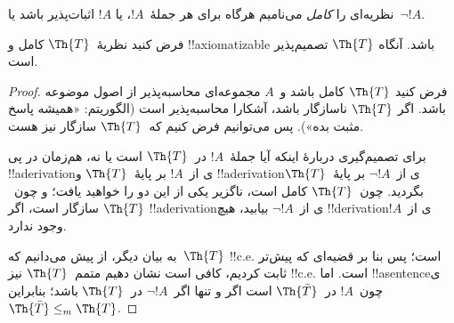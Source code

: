 \documentclass[../../../include/open-logic-section]{subfiles}
\begin{document}


نظریه‌ای را {\em کامل} می‌نامیم هرگاه برای هر جملهٔ~$!A$، یا
$!A$ اثبات‌پذیر باشد یا~$\lnot !A$.

\begin{lem}
فرض کنید نظریهٔ~$\Th{T}$ کامل و !!{axiomatizable} باشد. آنگاه
$\Th{T}$ تصمیم‌پذیر است.
\end{lem}

\begin{proof}
فرض کنید $\Th{T}$ کامل باشد و~$A$ مجموعه‌ای محاسبه‌پذیر از اصول موضوعه
باشد. اگر $\Th{T}$ ناسازگار باشد، آشکارا محاسبه‌پذیر است (الگوریتم:
«همیشه پاسخ مثبت بده»). پس می‌توانیم فرض کنیم که~$\Th{T}$ سازگار نیز
هست.

برای تصمیم‌گیری دربارهٔ اینکه آیا جملهٔ~$!A$ در~$\Th{T}$ است یا نه،
هم‌زمان در پی !!a{derivation}ی از~$!A$ بر پایهٔ~$\Th{T}$ و
!!a{derivation}ی از~$\lnot !A$ بر پایهٔ~$\Th{T}$ بگردید. چون~$\Th{T}$ کامل است، ناگزیر
یکی از این دو را خواهید یافت؛ و چون~$\Th{T}$ سازگار است، اگر
!!a{derivation}ی از~$\lnot !A$ بیابید، هیچ !!{derivation}ی از~$!A$
وجود ندارد.

به بیان دیگر، از پیش می‌دانیم که~$\Th{T}$ !!{c.e.} است؛ پس بنا بر
قضیه‌ای که پیش‌تر ثابت کردیم، کافی است نشان دهیم متمم~$\Th{T}$ نیز
!!{c.e.} است. اما !!a{sentence}ی چون~$!A$ در~$\Th{\bar T}$ است اگر و
تنها اگر~$\lnot !A$ در~$\Th{T}$ باشد؛ بنابراین
$\Th{\bar T} \leq_m \Th{T}$.
\end{proof}
\end{document}
